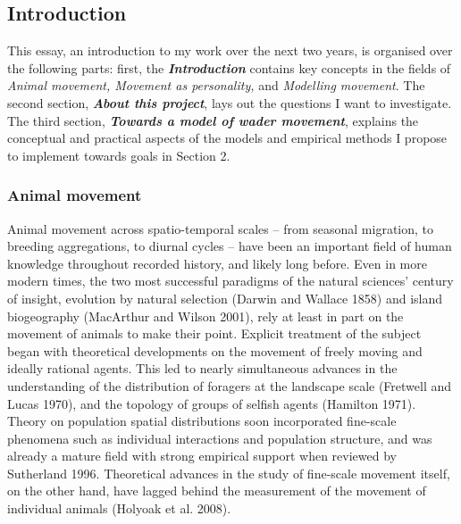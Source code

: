 \documentclass[]{scrartcl}
\begin{document}
\begin{linenumbers}
	
\part{Introduction}\label{introduction}

This essay, an introduction to my work over the next two years, is
organised over the following parts: first, the
\emph{\textbf{Introduction}} contains key concepts in the fields of
\emph{Animal movement, Movement as personality,} and \emph{Modelling
	movement}. The second section, \emph{\textbf{About this project}}, lays
out the questions I want to investigate. The third section,
\emph{\textbf{Towards a model of wader movement}}, explains the
conceptual and practical aspects of the models and empirical methods I
propose to implement towards goals in Section 2.

    \section{Animal movement}\label{animal-movement}


Animal movement across spatio-temporal scales -- from seasonal
migration, to breeding aggregations, to diurnal cycles -- have been an
important field of human knowledge throughout recorded history, and
likely long before. Even in more modern times, the two most successful
paradigms of the natural sciences' century of insight, evolution by
natural selection (Darwin and Wallace 1858) and island biogeography
(MacArthur and Wilson 2001), rely at least in part on the movement of
animals to make their point. Explicit treatment of the subject began
with theoretical developments on the movement of freely moving and
ideally rational agents. This led to nearly simultaneous advances in the
understanding of the distribution of foragers at the landscape scale
(Fretwell and Lucas 1970), and the topology of groups of selfish agents
(Hamilton 1971). Theory on population spatial distributions soon
incorporated fine-scale phenomena such as individual interactions and
population structure, and was already a mature field with strong
empirical support when reviewed by Sutherland 1996. Theoretical advances
in the study of fine-scale movement itself, on the other hand, have
lagged behind the measurement of the movement of individual animals
(Holyoak et al. 2008).


\end{linenumbers}
\end{document}
